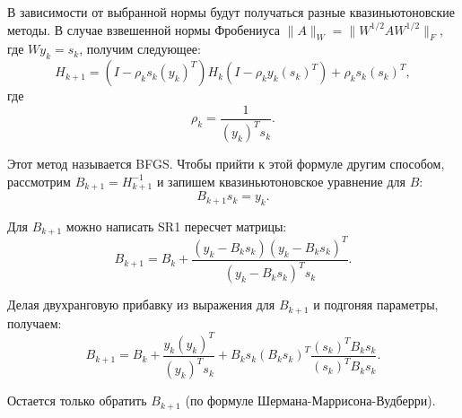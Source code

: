В зависимости от выбранной нормы будут получаться разные квазиньютоновские методы. В случае взвешенной нормы Фробениуса $\|A\|_W = \|W^{1/2} A W^{1/2}\|_F$, где $W y_k = s_k$, получим следующее:
$$ H_{k+1} = (I - \rho_k s_k (y_k)^T) H_k (I - \rho_k y_k (s_k)^T) + \rho_k s_k (s_k)^T, $$
где
$$ \rho_k = \frac{1}{(y_k)^T s_k}. $$

Этот метод называется BFGS. Чтобы прийти к этой формуле другим способом, рассмотрим $B_{k+1} = H_{k+1}^{-1}$ и запишем квазиньютоновское уравнение для $B$:
$$ B_{k+1} s_k = y_k. $$

Для $B_{k+1}$ можно написать SR1 пересчет матрицы:
$$ B_{k+1} = B_k + \frac{(y_k - B_k s_k)(y_k - B_k s_k)^T}{(y_k - B_k s_k)^T s_k}. $$

Делая двухранговую прибавку из выражения для $B_{k+1}$ и подгоняя параметры, получаем:
$$ B_{k+1} = B_k + \frac{y_k (y_k)^T}{(y_k)^T s_k} + B_k s_k (B_k s_k)^T \frac{(s_k)^T B_k s_k}{(s_k)^T B_k s_k}. $$

Остается только обратить $B_{k+1}$ (по формуле Шермана-Маррисона-Вудберри).
